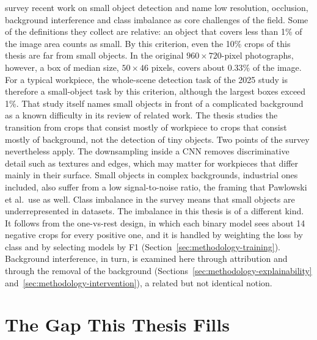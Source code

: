 \citet{nikouei2025smallobject} survey recent work on small object
detection and name low resolution, occlusion, background interference and class
imbalance as core challenges of the field. Some of the definitions they collect are
relative: an object that covers less than 1\% of the image area counts as small. By this
criterion, even the 10\% crops of this thesis are far from small objects. In the
original $960 \times 720$-pixel photographs, however, a box of median size,
$50 \times 46$ pixels, covers about 0.33\% of the image. For a typical workpiece, the
whole-scene detection task of the 2025 study \citep{schneidereitYOLOv8} is therefore a
small-object task by this criterion, although the largest boxes exceed 1\%.
That study itself names small objects in front of a complicated background as a known
difficulty in its review of related work. The thesis
studies the transition from crops that consist mostly of workpiece to crops that
consist mostly of background, not the detection of tiny objects. Two points of the
survey nevertheless apply. The downsampling inside a CNN removes discriminative detail
such as textures and edges, which may matter for workpieces that differ mainly in their
surface. Small objects in complex backgrounds, industrial ones included, also suffer from
a low signal-to-noise ratio, the framing that Pawlowski et al.\ use as well. Class
imbalance in the survey means that small objects are underrepresented in datasets. The
imbalance in this thesis is of a different kind. It follows from the one-vs-rest
design, in which each binary model sees about 14 negative crops for every positive one,
and it is handled by weighting the loss by class and by selecting models by F1
(Section~\ref{sec:methodology-training}). Background interference, in turn, is
examined here through attribution and through the removal of the background
(Sections~\ref{sec:methodology-explainability} and~\ref{sec:methodology-intervention}),
a related but not identical notion.

\section{The Gap This Thesis Fills}
\label{sec:related-work-gap}

